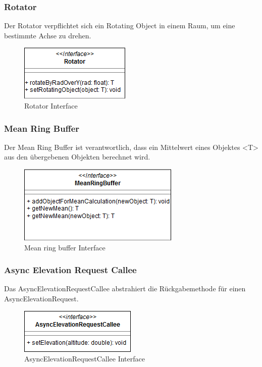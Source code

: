 \documentclass[a4paper]{scrreprt}
\begin{document}
\subsubsection{Rotator}
Der Rotator verpflichtet sich ein Rotating Object in einem Raum, um eine bestimmte Achse zu drehen.
\begin{figure}[h!]
	\center
	\includegraphics[scale=0.6]{Rotator.png}
	\caption{Rotator Interface}
\end{figure}


\subsubsection{Mean Ring Buffer}
Der Mean Ring Buffer ist verantwortlich, dass ein Mittelwert eines Objektes <T> aus den übergebenen Objekten berechnet wird.
\begin{figure}[h!]
	\center
	\includegraphics[scale=0.6]{MeanRingBuffer.png}
	\caption{Mean ring buffer Interface}
\end{figure}

\subsubsection{Async Elevation Request Callee}
Das AsyncElevationRequestCallee abstrahiert die Rückgabemethode für einen AsyncElevationRequest.
\begin{figure}[h!]
	\center
	\includegraphics[scale=0.6]{AsyncElevationRequestCallee.png}
	\caption{AsyncElevationRequestCallee Interface}
\end{figure}
\end{document}
